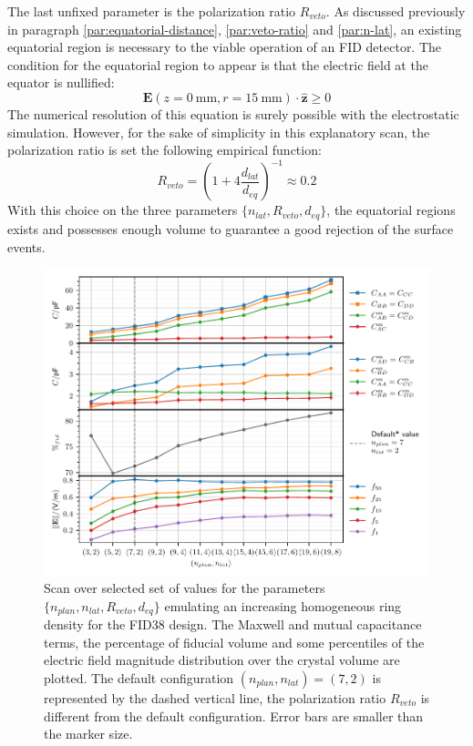 The last unfixed parameter is the polarization ratio $R_{veto}$. As discussed previously in paragraph \ref{par:equatorial-distance}, \ref{par:veto-ratio} and \ref{par:n-lat}, an existing equatorial region is necessary to the viable operation of an FID detector. The condition for the equatorial region to appear is that the electric field at the equator is nullified:
\begin{equation}
\bm{E}\left(z=\SI{0}{\mm}, r=\SI{15}{\mm} \right) \cdot \hat{\bm{z}} \geq 0
\end{equation}
The numerical resolution of this equation is surely possible with the electrostatic simulation. However, for the sake of simplicity in this explanatory scan, the polarization ratio is set the following empirical function:
\begin{equation}
R_{veto} = \left(1 + 4 \frac{d_{lat}}{d_{eq}} \right)^{-1} \approx 0.2
\end{equation}
With this choice on the three parameters $\{n_{lat}, R_{veto}, d_{eq}\}$, the equatorial regions exists and possesses enough volume to guarantee a good rejection of the surface events.

\begin{figure}
\centering
\includegraphics[scale=1]{Figures/ElectrodesScan/capacitance_fiducial_global_scale.pdf}
\caption{Scan over selected set of values for the parameters $\{n_{plan}, n_{lat}, R_{veto}, d_{eq}\}$ emulating an increasing homogeneous ring density for the FID38 design. The Maxwell and mutual capacitance terms, the percentage of fiducial volume and some percentiles of the electric field magnitude distribution over the crystal volume are plotted. The default configuration $(n_{plan}, n_{lat})=(7,2)$ is represented by the dashed vertical line, the polarization ratio $R_{veto}$ is different from the default configuration. Error bars are smaller than the marker size.}
\label{fig:capacitance-fiducial-global-scale}
\end{figure}

